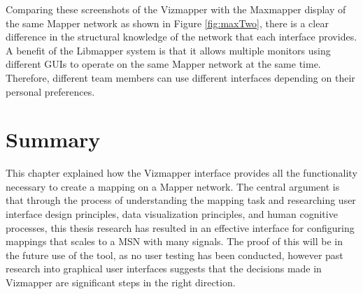 Comparing these screenshots of the Vizmapper with the Maxmapper display of the same Mapper network as shown in Figure \ref{fig:maxTwo}, there is a clear difference in the structural knowledge of the network that each interface provides. A benefit of the Libmapper system is that it allows multiple monitors using different GUIs to operate on the same Mapper network at the same time. Therefore, different team members can use different interfaces depending on their personal preferences. 

\section{Summary}

This chapter explained how the Vizmapper interface provides all the functionality necessary to create a mapping on a Mapper network. The central argument is that through the process of understanding the mapping task and researching user interface design principles, data visualization principles, and human cognitive processes, this thesis research has resulted in an effective interface for configuring mappings that scales to a MSN with many signals. The proof of this will be in the future use of the tool, as no user testing has been conducted, however past research into graphical user interfaces suggests that the decisions made in Vizmapper are significant steps in the right direction.
